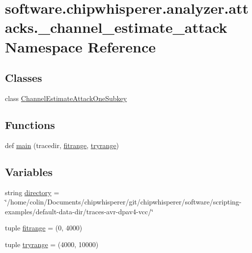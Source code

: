 \hypertarget{namespacesoftware_1_1chipwhisperer_1_1analyzer_1_1attacks_1_1__channel__estimate__attack}{}\section{software.\+chipwhisperer.\+analyzer.\+attacks.\+\_\+channel\+\_\+estimate\+\_\+attack Namespace Reference}
\label{namespacesoftware_1_1chipwhisperer_1_1analyzer_1_1attacks_1_1__channel__estimate__attack}
\subsection*{Classes}
\begin{DoxyCompactItemize}
\item 
class \hyperlink{classsoftware_1_1chipwhisperer_1_1analyzer_1_1attacks_1_1__channel__estimate__attack_1_1ChannelEstimateAttackOneSubkey}{Channel\+Estimate\+Attack\+One\+Subkey}
\end{DoxyCompactItemize}
\subsection*{Functions}
\begin{DoxyCompactItemize}
\item 
def \hyperlink{namespacesoftware_1_1chipwhisperer_1_1analyzer_1_1attacks_1_1__channel__estimate__attack_a8a2b206889bacda130ce0bb83754ada8}{main} (tracedir, \hyperlink{namespacesoftware_1_1chipwhisperer_1_1analyzer_1_1attacks_1_1__channel__estimate__attack_a1662e9ab6f7af0176fcf252b14654395}{fitrange}, \hyperlink{namespacesoftware_1_1chipwhisperer_1_1analyzer_1_1attacks_1_1__channel__estimate__attack_acb22ab50a9a058ace0d8488dbe061a3c}{tryrange})
\end{DoxyCompactItemize}
\subsection*{Variables}
\begin{DoxyCompactItemize}
\item 
string \hyperlink{namespacesoftware_1_1chipwhisperer_1_1analyzer_1_1attacks_1_1__channel__estimate__attack_afed662c16c0840677b0448500965e8a1}{directory} = \char`\"{}/home/colin/Documents/chipwhisperer/git/chipwhisperer/software/scripting-\/examples/default-\/data-\/dir/traces-\/avr-\/dpav4-\/vcc/\char`\"{}
\item 
tuple \hyperlink{namespacesoftware_1_1chipwhisperer_1_1analyzer_1_1attacks_1_1__channel__estimate__attack_a1662e9ab6f7af0176fcf252b14654395}{fitrange} = (0, 4000)
\item 
tuple \hyperlink{namespacesoftware_1_1chipwhisperer_1_1analyzer_1_1attacks_1_1__channel__estimate__attack_acb22ab50a9a058ace0d8488dbe061a3c}{tryrange} = (4000, 10000)
\end{DoxyCompactItemize}


